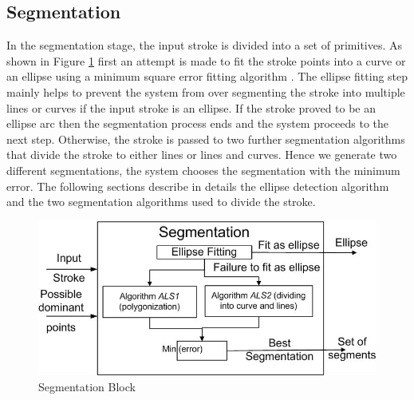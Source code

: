 \documentclass[preprint,10pt,5p,twocolumn]{elsarticle}
\begin{document}
\subsection{Segmentation}
\label{seg}
In the segmentation stage, the input stroke is divided into a set of primitives. As shown in Figure \ref{fig:segblock} first an attempt is made to fit the stroke points into a curve or an ellipse using a minimum square error fitting algorithm \cite{ellipsefit}. The ellipse fitting step mainly helps to prevent the system from over segmenting the stroke into multiple lines or curves if the input stroke is an ellipse. If the stroke proved to be an ellipse arc then the segmentation process ends and the system proceeds to the next step. Otherwise, the stroke is passed to two further segmentation algorithms that divide the stroke to either lines or lines and curves. Hence we generate two different segmentations, the system chooses the segmentation with the minimum error. The following sections describe in details the ellipse detection algorithm and the two segmentation algorithms used to divide the stroke. %
 \begin{figure}
	\centering
		\includegraphics[scale=0.48]{images/blockSmall.jpg}
	\caption{Segmentation Block} 
	\label{fig:segblock}
\end{figure}
\end{document}
